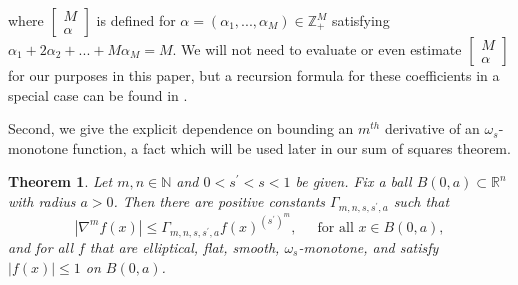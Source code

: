 \documentclass{amsart}
\newtheorem{theorem}{Theorem}[section]
\theoremstyle{plain}
\numberwithin{equation}{section}
\begin{document}
where $\left[ 
\begin{array}{c}
M \\ 
\alpha%
\end{array}%
\right] $ is defined for $\alpha =\left( \alpha _{1},...,\alpha _{M}\right)
\in \mathbb{Z}_{+}^{M}$ satisfying $\alpha _{1}+2\alpha _{2}+...+M\alpha
_{M}=M$. We will not need to evaluate or even estimate $\left[ 
\begin{array}{c}
M \\ 
\alpha%
\end{array}%
\right] $ for our purposes in this paper, but a recursion formula for these
coefficients in a special case can be found in \cite{MaSaUrVu}.

Second, we give the explicit dependence on bounding an $m^{th}$ derivative
of an $\omega _{s}$-monotone function, a fact which will be used later in
our sum of squares theorem.

\begin{theorem}
\label{s'^m}Let $m,n\in \mathbb{N}$ and $0<s^{\prime }<s<1$ be given. Fix a
ball $B\left( 0,a\right) \subset \mathbb{R}^{n}$ with radius $a>0$. Then
there are positive constants $\Gamma _{m,n,s,s^{\prime },a}$ such that 
\begin{equation}
\left\vert \nabla ^{m}f\left( x\right) \right\vert \leq \Gamma
_{m,n,s,s^{\prime },a}f\left( x\right) ^{\left( s^{\prime }\right) ^{m}},\ \
\ \ \ \text{\ for all }x\in B\left( 0,a\right) ,  \label{first high'}
\end{equation}%
and for all $f$ that are elliptical, flat, smooth, $\omega _{s}$-monotone,
and satisfy $\left\vert f\left( x\right) \right\vert \leq 1$ on $B\left(
0,a\right) $.
\end{theorem}
\end{document}

